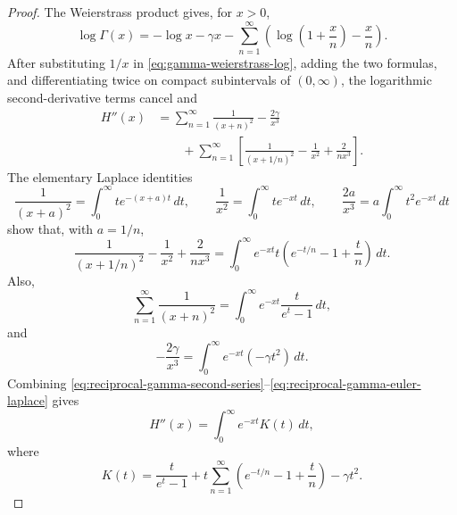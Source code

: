 \documentclass[11pt]{article}
\numberwithin{equation}{section}
\theoremstyle{definition}
\theoremstyle{remark}
\newcommand{\1}{\mathbf 1}
\begin{document}
\begin{proof}
The Weierstrass product gives, for \(x>0\),
\begin{equation}
\label{eq:gamma-weierstrass-log}
\log\Gamma(x)
=-\log x-\gamma x-\sum_{n=1}^{\infty}
\left(\log\left(1+\frac{x}{n}\right)-\frac{x}{n}\right).
\end{equation}
After substituting \(1/x\) in \eqref{eq:gamma-weierstrass-log}, adding the two formulas, and differentiating twice on compact subintervals of \((0,\infty)\), the logarithmic second-derivative terms cancel and
\begin{equation}
\label{eq:reciprocal-gamma-second-series}
\begin{aligned}
H''(x)
&=\sum_{n=1}^{\infty}\frac1{(x+n)^2}
-\frac{2\gamma}{x^3}\\
&\qquad+
\sum_{n=1}^{\infty}
\left[
\frac1{(x+1/n)^2}
-\frac1{x^2}
+\frac{2}{nx^3}
\right].
\end{aligned}
\end{equation}
The elementary Laplace identities
\begin{equation}
\label{eq:reciprocal-gamma-laplace-identities}
\frac1{(x+a)^2}=\int_0^\infty t e^{-(x+a)t}\,dt,\qquad
\frac1{x^2}=\int_0^\infty t e^{-xt}\,dt,\qquad
\frac{2a}{x^3}=a\int_0^\infty t^2e^{-xt}\,dt
\end{equation}
show that, with \(a=1/n\),
\begin{equation}
\label{eq:reciprocal-gamma-defect-laplace}
\frac1{(x+1/n)^2}-\frac1{x^2}+\frac{2}{nx^3}
=\int_0^\infty e^{-xt}t\left(e^{-t/n}-1+\frac{t}{n}\right)\,dt.
\end{equation}
Also,
\begin{equation}
\label{eq:reciprocal-gamma-trigamma-laplace}
\sum_{n=1}^{\infty}\frac1{(x+n)^2}
=\int_0^\infty e^{-xt}\frac{t}{e^t-1}\,dt,
\end{equation}
and
\begin{equation}
\label{eq:reciprocal-gamma-euler-laplace}
-\frac{2\gamma}{x^3}
=\int_0^\infty e^{-xt}(-\gamma t^2)\,dt.
\end{equation}
Combining \eqref{eq:reciprocal-gamma-second-series}--\eqref{eq:reciprocal-gamma-euler-laplace} gives
\begin{equation}
\label{eq:reciprocal-gamma-kernel-representation}
H''(x)=\int_0^\infty e^{-xt}K(t)\,dt,
\end{equation}
where
\begin{equation}
\label{eq:reciprocal-gamma-kernel}
K(t)=\frac{t}{e^t-1}
+t\sum_{n=1}^{\infty}\left(e^{-t/n}-1+\frac{t}{n}\right)
-\gamma t^2.
\end{equation}


\end{proof}
\end{document}
